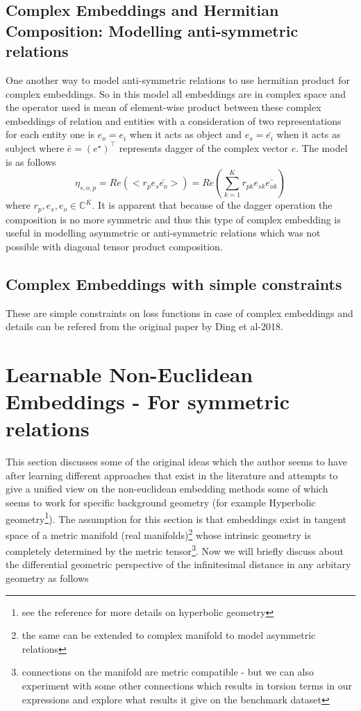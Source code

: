 \documentclass[12pt]{article}
\begin{document}
\subsection{Complex Embeddings and Hermitian Composition: Modelling anti-symmetric relations}
One another way to model anti-symmetric relations to use hermitian product for complex embeddings. So in this model all embeddings are in complex space and the operator used is mean of element-wise product between these complex embeddings of relation and entities with a consideration of two representations for each entity one is $e_{o}=e_{i}$ when it acts as object and $e_{s}=\bar{e_{i}}$ when it acts as subject where $\bar{e}=(e^{\star})^{\intercal}$ represents dagger of the complex vector $e$. The model is as follows
\begin{equation}
\eta_{s, o, p} = Re(<r_{p}e_{s}\bar{e_{o}}>) = Re(\sum_{k=1}^{K}r_{pk}e_{sk}\bar{e_{ok}})
\end{equation} where $r_{p}, e_{s}, e_{o} \in \mathbb{C}^{K}$. It is apparent that because of the dagger operation the composition is no more symmetric and thus this type of complex embedding is useful in modelling asymmetric or anti-symmetric relations which was not possible with diagonal tensor product composition.
\subsection{Complex Embeddings with simple constraints}
These are simple constraints on loss functions in case of complex embeddings and details can be refered from the original paper by Ding et al-2018.
\section{Learnable Non-Euclidean Embeddings - For symmetric relations}
This section discusses some of the original ideas which the author seems to have after learning different approaches that exist in the literature and attempts to give a unified view on the non-euclidean embedding methods some of which seems to work for specific background geometry (for example Hyperbolic geometry\footnote{see the reference for more details on hyperbolic geometry}). The assumption for this section is that embeddings exist in tangent space of a metric manifold (real manifolds)\footnote{the same can be extended to complex manifold to model asymmetric relations} whose intrinsic geometry is completely determined by the metric tensor\footnote{connections on the manifold are metric compatible - but we can also experiment with some other connections which results in torsion terms in our expressions and explore what results it give on the benchmark dataset}. Now we will briefly discuss about the differential geometric perspective of the infinitesimal distance in any arbitary geometry as follows
\end{document}
